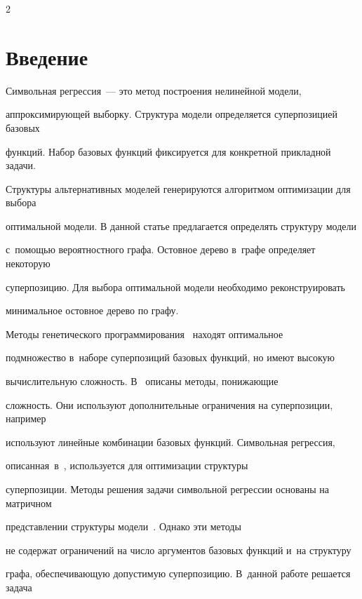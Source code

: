 \begin{multicols}{2}



\label{st\stat}



\section{Введение}



Символьная регрессия~--- это метод по\-стро\-ения нелинейной модели, 

аппроксимирующей выборку. Структура модели определяется суперпозицией базовых 

функций. Набор базовых функций фиксируется для конкретной прикладной задачи. 

Структуры альтернативных моделей генерируются алгоритмом оптимизации для выбора 

оптимальной модели. В данной статье предлагается определять структуру модели 

с~по\-мощью вероятностного графа. Остовное дерево в~графе определяет некоторую 

суперпозицию. Для выбора оптимальной модели необходимо реконструировать 

минимальное остовное дерево по графу.



Методы генетического программирования~\cite{koza1992genetic} находят оптимальное 

подмножество в~наборе суперпозиций базовых функций, но имеют высокую 

вычислительную сложность. В~\cite{searson2010gptips} описаны методы, понижающие 

сложность. Они используют дополнительные ограничения на суперпозиции, например 

используют линейные комбинации базовых функций. Символьная регрессия, 

описанная~в~\cite{stanley2002evolving}, используется для оптимизации структуры 

суперпозиции. Методы решения задачи символьной регрессии основаны на матричном 

представлении структуры модели~\cite{bochkarev2017generation}. Однако эти методы 

не содержат ограничений на чис\-ло аргументов базовых функций и~на структуру 

графа, обеспечивающую допустимую суперпозицию. В~данной работе решается задача 


\end{multicols}

